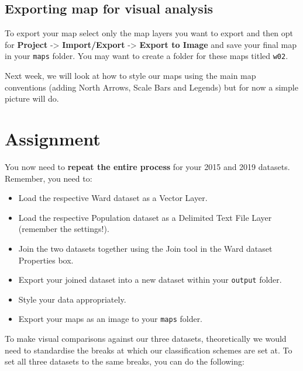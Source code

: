 \documentclass[
]{book}
\providecommand{\tightlist}{%
  \setlength{\itemsep}{0pt}\setlength{\parskip}{0pt}}
\begin{document}
\hypertarget{exporting-map-for-visual-analysis}{%
\subsection{Exporting map for visual analysis}\label{exporting-map-for-visual-analysis}}

To export your map select only the map layers you want to export and then opt for \textbf{Project} -\textgreater{} \textbf{Import/Export} -\textgreater{} \textbf{Export to Image} and save your final map in your \texttt{maps} folder. You may want to create a folder for these maps titled \texttt{w02}.

Next week, we will look at how to style our maps using the main map conventions (adding North Arrows, Scale Bars and Legends) but for now a simple picture will do.

\hypertarget{assignment-w02}{%
\section{Assignment}\label{assignment-w02}}

You now need to \textbf{repeat the entire process} for your 2015 and 2019 datasets. Remember, you need to:

\begin{itemize}
\tightlist
\item
  Load the respective Ward dataset as a Vector Layer.
\item
  Load the respective Population dataset as a Delimited Text File Layer (remember the settings!).
\item
  Join the two datasets together using the Join tool in the Ward dataset Properties box.
\item
  Export your joined dataset into a new dataset within your \texttt{output} folder.
\item
  Style your data appropriately.
\item
  Export your maps as an image to your \texttt{maps} folder.
\end{itemize}

To make visual comparisons against our three datasets, theoretically we would need to standardise the breaks at which our classification schemes are set at. To set all three datasets to the same breaks, you can do the following:
\end{document}

